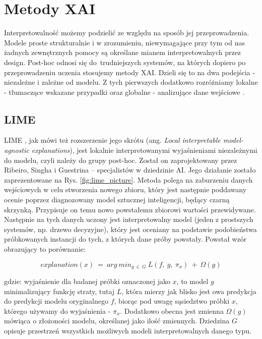 \section{Metody XAI} \label{metody_xai}
Interpretowalność możemy podzielić ze względu na sposób jej przeprowadzenia. Modele proste strukturalnie i w zrozumieniu, niewymagające przy tym od nas żadnych zewnętrznych pomocy są określane mianem interpretowalnych przez design. Post-hoc odnosi się do~trudniejszych systemów, na których dopiero po przeprowadzeniu uczenia stosujemy metody XAI. Dzieli się to na dwa podejścia - niezależne i zależne od modelu. Z tych pierwszych dodatkowo rozróżniamy lokalne - tłumaczące wskazane przypadki oraz globalne - analizujące dane wejściowe \cite{molnar2025}.

\subsection{LIME}
LIME \cite{molnar2025, oreilly_lime}, jak mówi też rozszerzenie jego skrótu (ang. \textit{Local interpretable model-agnostic explanations}), jest lokalnie interpretowanymi wyjaśnieniami niezależnymi do modelu, czyli należy do grupy post-hoc. Został on zaprojektowany przez Ribeiro, Singha i Guestrina – specjalistów w dziedzinie AI. Jego działanie zostało zaprezentowane na Rys. \ref{fig:lime_picture}. Metoda polega na zaburzeniu danych wejściowych w celu stworzenia nowego zbioru, który jest następnie poddawany ocenie poprzez diagnozowany model sztucznej inteligencji, będący czarną skrzynką. Przypisuje on temu nowo powstałemu zbiorowi wartości przewidywane. Następnie na tych danych uczony jest interpretowalny model (jeden z prostszych systemów, np. drzewo decyzyjne), który jest oceniany na podstawie podobieństwa próbkowanych instancji do tych, z których dane próby powstały. Powstał wzór obrazujący to porównanie:

\begin{equation} \label{lime_eqn}
explanation(x)\ =\ arg\ min_{g\ \in\ G}\ L(f,\ g,\ \pi_x)\ +\ \Omega(g)
\end{equation}

gdzie: wyjaśnienie dla badanej próbki oznaczonej jako $x$, to model $g$ minimalizujący funkcję straty, tutaj $L$, która mierzy jak blisko jest owa predykcja do predykcji modelu oryginalnego $f$, biorąc pod uwagę sąsiedztwo próbki $x$, którego używamy do wyjaśnienia - $\pi_x$. Dodatkowo obecna jest zmienna $\Omega(g)$ mówiąca o złożoności modelu, określanej jako ilość zmiennych. Dziedzina $G$ opisuje przestrzeń wszystkich możliwych modeli interpretowalnych danego typu. 
	
